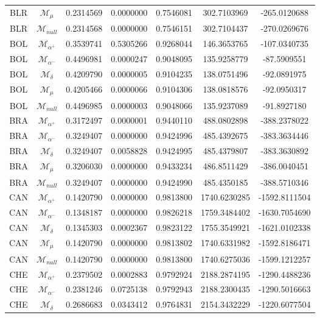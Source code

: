 \begin{tabular}{ccccccc}
BLR & $\mathcal{M}_{\mu}$ & 0.2314569 & 0.0000000 & 0.7546081 & 302.7103969 & -265.0120688\\
BLR & $\mathcal{M}_{null}$ & 0.2314568 & 0.0000000 & 0.7546151 & 302.7104437 & -270.0269676\\
BOL & $\mathcal{M}_{\alpha^+}$ & 0.3539741 & 0.5305266 & 0.9268044 & 146.3653765 & -107.0340735\\
BOL & $\mathcal{M}_{\alpha^-}$ & 0.4496981 & 0.0000247 & 0.9048095 & 135.9258779 & -87.5909551\\
BOL & $\mathcal{M}_{\delta}$ & 0.4209790 & 0.0000005 & 0.9104235 & 138.0751496 & -92.0891975\\
BOL & $\mathcal{M}_{\mu}$ & 0.4205466 & 0.0000066 & 0.9104306 & 138.0818576 & -92.0950317\\
BOL & $\mathcal{M}_{null}$ & 0.4496985 & 0.0000003 & 0.9048066 & 135.9237089 & -91.8927180\\
BRA & $\mathcal{M}_{\alpha^+}$ & 0.3172497 & 0.0000001 & 0.9440110 & 488.0802898 & -388.2378022\\
BRA & $\mathcal{M}_{\alpha^-}$ & 0.3249407 & 0.0000000 & 0.9424996 & 485.4392675 & -383.3634446\\
BRA & $\mathcal{M}_{\delta}$ & 0.3249407 & 0.0058828 & 0.9424995 & 485.4379807 & -383.3630892\\
BRA & $\mathcal{M}_{\mu}$ & 0.3206030 & 0.0000000 & 0.9433234 & 486.8511429 & -386.0040451\\
BRA & $\mathcal{M}_{null}$ & 0.3249407 & 0.0000000 & 0.9424990 & 485.4350185 & -388.5710346\\
CAN & $\mathcal{M}_{\alpha^+}$ & 0.1420790 & 0.0000000 & 0.9813800 & 1740.6230285 & -1592.8111504\\
CAN & $\mathcal{M}_{\alpha^-}$ & 0.1348187 & 0.0000000 & 0.9826218 & 1759.3484402 & -1630.7054690\\
CAN & $\mathcal{M}_{\delta}$ & 0.1345303 & 0.0002367 & 0.9823122 & 1755.3549921 & -1621.0102338\\
CAN & $\mathcal{M}_{\mu}$ & 0.1420790 & 0.0000000 & 0.9813802 & 1740.6331982 & -1592.8186471\\
CAN & $\mathcal{M}_{null}$ & 0.1420790 & 0.0000000 & 0.9813800 & 1740.6275036 & -1599.1212257\\
CHE & $\mathcal{M}_{\alpha^+}$ & 0.2379502 & 0.0002883 & 0.9792924 & 2188.2874195 & -1290.4488236\\
CHE & $\mathcal{M}_{\alpha^-}$ & 0.2381246 & 0.0725138 & 0.9792943 & 2188.2300435 & -1290.5016663\\
CHE & $\mathcal{M}_{\delta}$ & 0.2686683 & 0.0343412 & 0.9764831 & 2154.3432229 & -1220.6077504\\

\end{tabular}
